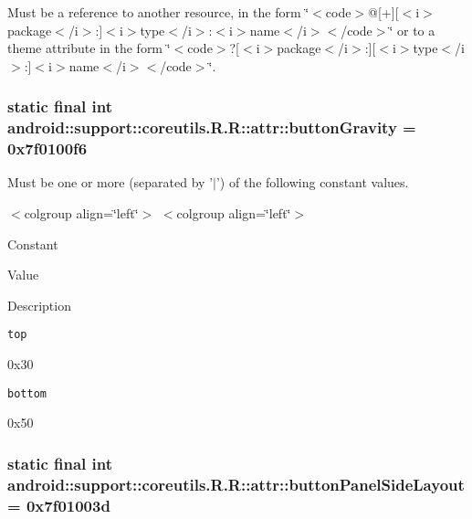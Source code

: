 Must be a reference to another resource, in the form \char`\"{}$<$code$>$@\mbox{[}+\mbox{]}\mbox{[}$<$i$>$package$<$/i$>$:\mbox{]}$<$i$>$type$<$/i$>$:$<$i$>$name$<$/i$>$$<$/code$>$\char`\"{} or to a theme attribute in the form \char`\"{}$<$code$>$?\mbox{[}$<$i$>$package$<$/i$>$:\mbox{]}\mbox{[}$<$i$>$type$<$/i$>$:\mbox{]}$<$i$>$name$<$/i$>$$<$/code$>$\char`\"{}. \hypertarget{classandroid_1_1support_1_1coreutils_1_1_r_1_1attr_da3689a99848fb40b499b7a851395a01}{
\subsubsection[{buttonGravity}]{\setlength{\rightskip}{0pt plus 5cm}static final int android::support::coreutils.R.R::attr::buttonGravity = 0x7f0100f6}}
\label{classandroid_1_1support_1_1coreutils_1_1_r_1_1attr_da3689a99848fb40b499b7a851395a01}


Must be one or more (separated by '$|$') of the following constant values. \begin{TabularC}{0}
\hline
\end{TabularC}
$<$colgroup align=\char`\"{}left\char`\"{}$>$ $<$colgroup align=\char`\"{}left\char`\"{}$>$ 

Constant

Value

Description 

{\tt top}

0x30

{\tt bottom}

0x50\hypertarget{classandroid_1_1support_1_1coreutils_1_1_r_1_1attr_fa4d1493c8a14d38c667801b87ceacee}{
\subsubsection[{buttonPanelSideLayout}]{\setlength{\rightskip}{0pt plus 5cm}static final int android::support::coreutils.R.R::attr::buttonPanelSideLayout = 0x7f01003d}}
\label{classandroid_1_1support_1_1coreutils_1_1_r_1_1attr_fa4d1493c8a14d38c667801b87ceacee}


